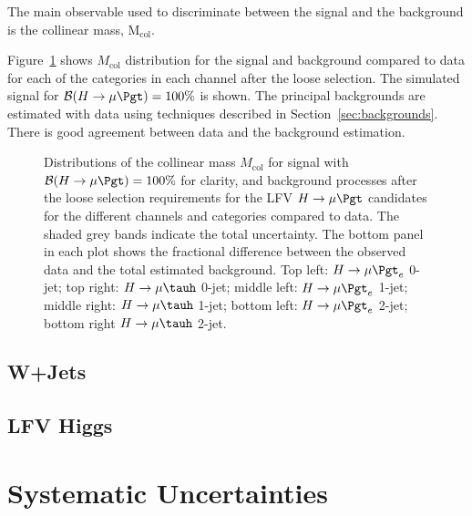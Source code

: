 The main observable used to discriminate between the signal and the background  is the collinear
mass, $\text{M}_{\text{col}}$.

Figure~\ref{fig:Mcol_after_presel_WITHDATA} shows $M_\text{col}$ distribution for the signal and background compared to data for each of the
categories in each channel after the loose selection. The simulated signal  for $\mathcal{B}(H \rightarrow \mu \Pgt )=100\%$ is shown. The principal backgrounds are estimated with data using techniques described in
Section~\ref{sec:backgrounds}.  There is good agreement between data and the background estimation.


\begin{figure}[hbtp]\centering
 \caption{Distributions of the collinear mass $M_\text{col}$ for signal with $\mathcal{B}(H \rightarrow \mu \Pgt )=100\%$ for clarity, and background processes after the loose selection requirements for the LFV $H \rightarrow \mu \Pgt$ candidates for the different channels and categories compared to data. The shaded grey bands indicate the total uncertainty. The bottom panel in each plot shows the fractional difference between the observed data and the total estimated background.  Top left: $H \rightarrow \mu \Pgt_{e}$ 0-jet; top right: $H \rightarrow \mu \tauh$ 0-jet;  middle left: $H \rightarrow \mu \Pgt_{e}$ 1-jet; middle right: $H \rightarrow \mu \tauh$
1-jet; bottom left: $H \rightarrow \mu \Pgt_{e}$ 2-jet; bottom right $H \rightarrow \mu \tauh$ 2-jet. }
 \label{fig:Mcol_after_presel_WITHDATA}\end{figure}
\subsection{W+Jets}
\subsection{LFV Higgs}
\section{Systematic Uncertainties}
